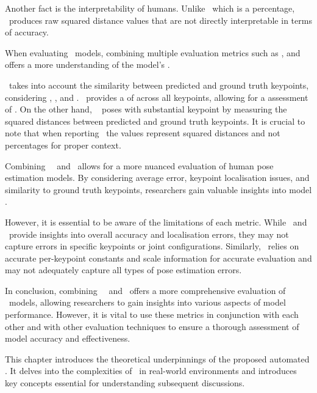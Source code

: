 Another fact is the interpretability of humans. Unlike \APE\, which is a percentage, \MSE\ produces raw squared distance values that are not directly interpretable in terms of accuracy.


When evaluating \HPE\ models, combining multiple evaluation metrics such as \pojem{\OKS}, \pojem{\APE} and \pojem{\MSE} offers a more  understanding of the model's .

\OKS\ takes into account the similarity between predicted and ground truth keypoints, considering , , and . \APE\ provides a  of  across all keypoints, allowing for a  assessment of . On the other hand, \MSE\  poses with substantial keypoint  by measuring the squared distances between predicted and ground truth keypoints. It is crucial to note that when reporting \MSE\, the values represent squared distances and not percentages for proper context.

Combining \OKS\, \APE\ and \MSE\ allows for a more nuanced evaluation of hu\-man pose estimation models. By considering average error, keypoint localisation issues, and similarity to ground truth keypoints, researchers gain valuable insights into model .

However, it is essential to be aware of the limitations of each metric. While \APE\ and \MSE\ provide insights into overall accuracy and localisation errors, they may not capture errors in specific keypoints or joint configurations. Similarly, \OKS\ relies on accurate per-keypoint constants and scale information for accurate evaluation and may not adequately capture all types of pose estimation errors.

In conclusion, combining \OKS\, \APE\ and \MSE\ offers a more comprehensive evaluation of \HPE\ models, allowing researchers to gain in\-sights into various aspects of model performance. However, it is vital to use these metrics in conjunction with each other and with other evaluation techniques to ensure a thorough assessment of model accuracy and effectiveness.

This chapter introduces the theoretical underpinnings of the proposed automated . It delves into the complexities of \HPE\ in real-world environments and introduces key concepts essential for understanding subsequent discussions.

